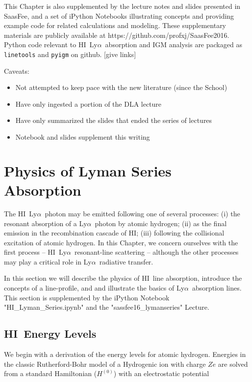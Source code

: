 \documentclass[graybox]{svmult}
\newcommand{\HI}{H{\sc I}}
\def\lya{Ly$\alpha$}
\begin{document}
This Chapter is also supplemented by the lecture notes
and slides presented in SaasFee, and a set of iPython
Notebooks illustrating concepts and providing 
example code for related calculations and modeling.
These supplementary materials are publicly available
at https://github.com/profxj/SaasFee2016.
Python code relevant to \HI\ \lya\ absorption and 
IGM analysis are packaged as  {\tt linetools}
and {\tt pyigm} on github. [give links]

Caveats:

\begin{itemize}
\item Not attempted to keep pace with the new literature (since the School)
\item Have only ingested a portion of the DLA lecture
\item Have only summarized the slides that ended the series of lectures
\item Notebook and slides supplement this writing
\end{itemize}

\section{Physics of Lyman Series Absorption}
\label{sec:physics}

The \HI\ \lya\ photon may be emitted following one
of several processes:
 (i) the resonant absorption of a \lya\ photon by atomic hydrogen;
 (ii) as the final emission in the recombination cascade of \HI;
 (iii) following the collisional excitation of atomic hydrogen.
In this Chapter, we concern ourselves with the first process --
\HI\ \lya\ resonant-line scattering -- although the other
processes may play a critical role in \lya\ radiative transfer.

In this section we will
  describe the physics of \HI\ line absorption,
  introduce the concepts of a line-profile, and
  and illustrate the basics of \lya\ absorption lines.
This section is supplemented by the iPython Notebook
"HI\_Lyman\_Series.ipynb" and the "sassfee16\_lymanseries"
Lecture.

\subsection{\HI\ Energy Levels}

We begin with a derivation of the energy levels 
for atomic hydrogen.  Energies in the classic
Rutherford-Bohr model of a Hydrogenic ion with charge
$Ze$ are solved from a standard Hamiltonian ($H^{(0)}$)
with an electrostatic potential
\end{document}
